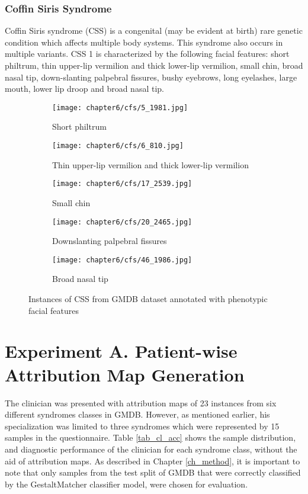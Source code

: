 \documentclass[../report.tex]{subfiles}
\begin{document}
	 \subsubsection{Coffin Siris Syndrome}
	 	Coffin Siris syndrome (CSS) is a congenital (may be evident at birth) rare genetic condition which affects multiple body systems. This syndrome also occurs in multiple variants. CSS 1 is characterized by the following facial features: short philtrum, thin upper-lip vermilion and thick lower-lip vermilion, small chin, broad nasal tip, down-slanting palpebral fissures, bushy eyebrows, long eyelashes, large mouth, lower lip droop and broad nasal tip.
	 \begin{figure}[H]\label{fig_cfs}
	 	\centering
	 	\begin{subfigure}[t]{0.17\textwidth}
	 		\centering
	 		\texttt{[image: chapter6/cfs/5\_1981.jpg]}
	 		\caption{Short philtrum}
	 	\end{subfigure}
	 	\begin{subfigure}[t]{0.17\textwidth}
	 		\centering
	 		\texttt{[image: chapter6/cfs/6\_810.jpg]}
	 		\caption{Thin upper-lip vermilion and thick lower-lip vermilion }
	 	\end{subfigure}	
	 	\begin{subfigure}[t]{0.17\textwidth}
	 		\centering
	 		\texttt{[image: chapter6/cfs/17\_2539.jpg]}
	 		\caption{Small chin}
	 	\end{subfigure}	
	 	\begin{subfigure}[t]{0.17\textwidth}
	 		\centering
	 		\texttt{[image: chapter6/cfs/20\_2465.jpg]}
	 		\caption{Downslanting palpebral fissures}
	 	\end{subfigure}	
	 	\begin{subfigure}[t]{0.17\textwidth}
	 		\centering
	 		\texttt{[image: chapter6/cfs/46\_1986.jpg]}
	 		\caption{Broad nasal tip}
	 	\end{subfigure}	
	 	\caption[Instances of HPMRS from GMDB dataset]{Instances of CSS from GMDB dataset annotated with phenotypic facial features}
	 \end{figure}
	 
	 
    \section{Experiment A. Patient-wise Attribution Map Generation}
    The clinician was presented with attribution maps of 23 instances from six different syndromes classes in GMDB. However, as mentioned earlier, his specialization was limited to three syndromes which were represented by 15 samples in the questionnaire. Table \ref{tab_cl_acc} shows the sample distribution, and diagnostic performance of the clinician for each syndrome class, without the aid of attribution maps. As described in  Chapter \ref{ch_method}, it is important to note that only samples from the test split of GMDB that were correctly classified by the GestaltMatcher classifier model, were chosen for evaluation. 
    
\end{document}
